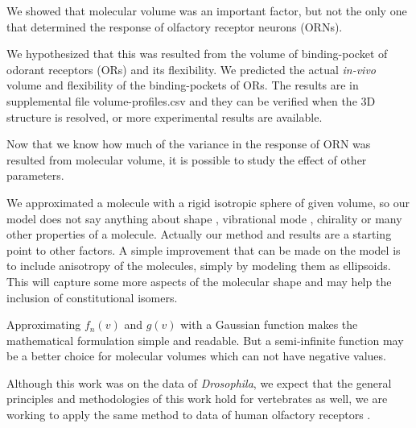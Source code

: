 \documentclass[11pt]{paper} %
\begin{document}
We showed that molecular volume was an important factor, 
but not the only one that determined the response of olfactory receptor neurons (ORNs). 

We hypothesized that this was resulted from the volume of binding-pocket of odorant receptors (ORs) and its flexibility. 
We predicted the actual \textit{in-vivo} volume and flexibility of the binding-pockets of ORs. 
The results are in supplemental file volume-profiles.csv and they can be verified when the 3D structure is resolved, 
or more experimental results are available. 

Now that we know how much of the variance in the response of ORN was resulted from molecular volume, 
it is possible to study the effect of other parameters.

We approximated a molecule with a rigid isotropic sphere of given volume, 
so our model does not say anything about shape \cite{}, vibrational mode \cite{}, chirality \cite{some and this: Dissipative Vibrational Model for Chiral Recognition in Olfaction} or many other properties of a molecule.
Actually our method and results are a starting point to other factors. 
A simple improvement that can be made on the model is to include anisotropy of the molecules, 
simply by modeling  them as ellipsoids. 
This will capture some more aspects of the molecular shape and may help the inclusion of constitutional isomers. 

Approximating $f_n(v)$ and $g(v)$ with a Gaussian function makes the mathematical formulation simple and readable. 
But a semi-infinite function may be a better choice for molecular volumes which can not have negative values.

Although this work was on the data of \textit{Drosophila}, 
we expect that the general principles and methodologies of this work hold for vertebrates as well, 
we are working to apply the same method to data of human olfactory receptors \cite{}.



\end{document}
